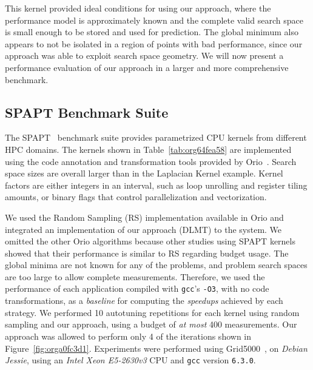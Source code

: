 \documentclass[conference]{IEEEtran}
\begin{document}
This kernel provided ideal conditions for using our approach, where the
performance model is approximately known and the complete valid search space is
small enough to be stored and used for prediction. The global minimum also
appears to not be isolated in a region of points with bad performance, since our
approach was able to exploit search space geometry. We will now present a
performance evaluation of our approach in a larger and more comprehensive
benchmark.
\subsection{SPAPT Benchmark Suite}
\label{sec:orgbb7caad}
The SPAPT~\cite{balaprakash2012spapt} benchmark suite provides
parametrized CPU kernels from different HPC domains. The
kernels shown in Table~\ref{tab:org64fea58} are implemented using the code
annotation and transformation tools provided by
Orio~\cite{hartono2009annotation}. Search space sizes are overall larger
than in the Laplacian Kernel example. Kernel factors are either integers in an
interval, such as loop unrolling and register tiling amounts, or binary flags
that control parallelization and vectorization.

We used the Random Sampling (RS) implementation available in Orio and integrated
an implementation of our approach (DLMT) to the system. We omitted the other
Orio algorithms because other studies using SPAPT
kernels~\cite{balaprakash2011can,balaprakash2012experimental} showed that
their performance is similar to RS regarding budget usage. The global minima are
not known for any of the problems, and problem search spaces are too large to
allow complete measurements. Therefore, we used the performance of each
application compiled with \texttt{gcc}'s \texttt{-O3}, with no code
transformations, as a \emph{baseline} for computing the \emph{speedups} achieved by each
strategy. We performed 10 autotuning repetitions for each kernel using random
sampling and our approach, using a budget of \emph{at most} 400 measurements. Our
approach was allowed to perform only 4 of the iterations shown in
Figure~\ref{fig:orga0fc3d1}. Experiments were performed using
Grid5000~\cite{balouek2013adding}, on \emph{Debian Jessie}, using an \emph{Intel
Xeon E5-2630v3} CPU and \texttt{gcc} version \texttt{6.3.0}.
\end{document}
